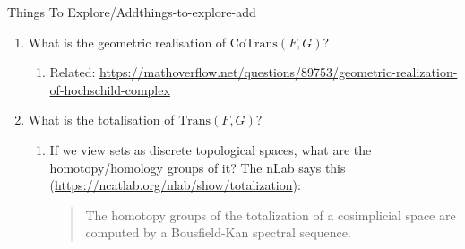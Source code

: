 \begin{remark}{Things To Explore/Add}{things-to-explore-add}
\begin{enumerate}
\begin{enumerate}
                    \begin{enumerate}
                        \item recovers map $\rmZ(G)\times\Cl(G)\to\Cl(G)$.
                    \end{enumerate}
                \item What is the geometric realisation of $\mathrm{CoTrans}(F,G)$?
                    \begin{enumerate}
                        \item Related: \url{https://mathoverflow.net/questions/89753/geometric-realization-of-hochschild-complex}
                    \end{enumerate}
                \item What is the totalisation of $\mathrm{Trans}(F,G)$?
                    \begin{enumerate}
                        \item If we view sets as discrete topological spaces, what are the homotopy/homology groups of it? The nLab says this (\url{https://ncatlab.org/nlab/show/totalization}):
                            \begin{quote}
                                The homotopy groups of the totalization of a cosimplicial space are computed by a Bousfield-Kan spectral sequence.


\end{quote}
\end{enumerate}
\end{enumerate}
\end{enumerate}
\end{remark}
